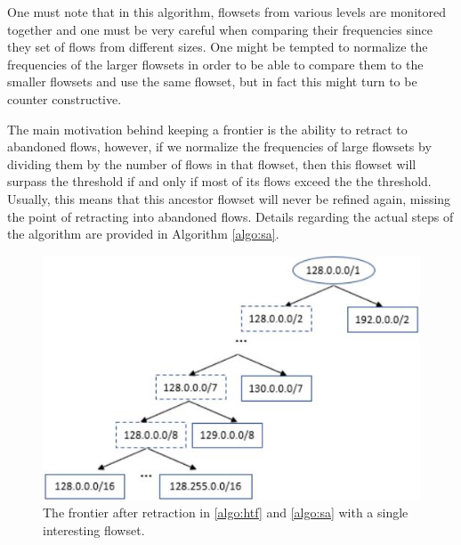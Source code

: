 One must note that in this algorithm, flowsets from various levels are monitored together and one must be very careful when comparing their frequencies since they set of flows from different sizes. One might be tempted to normalize the frequencies of the larger flowsets in order to be able to compare them to the smaller flowsets and use the same flowset, but in fact this might turn to be counter constructive.

The main motivation behind keeping a frontier is the ability to retract to abandoned flows, however, if we normalize the frequencies of large flowsets by dividing them by the number of flows in that flowset, then this flowset will surpass the threshold if and only if most of its flows exceed the the threshold. Usually, this means that this ancestor flowset will never be refined again, missing the point of retracting into abandoned flows.  Details regarding the actual steps of the algorithm are provided in Algorithm  \ref{algo:sa}.

\begin{figure}
	\centering
	\includegraphics[width=\linewidth]{HHH/jpg_figures/sa_vs_htf.JPG}
\caption{The frontier after retraction in \ref{algo:htf} and \ref{algo:sa} with a single interesting flowset.}
\label{fig:sa_vs_htf}
\end{figure}

